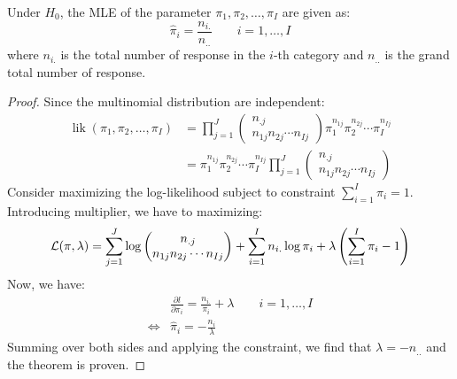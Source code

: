 \begin{proposition}
    Under $H_0$, the MLE of the parameter $\pi_1,\pi_2,\dots,\pi_I$ are given as:
    \begin{equation*}
        \hat{\pi}_i = \frac{n_{i.}}{n_{..}} \qquad i = 1,\dots,I
    \end{equation*}
    where $n_{i.}$ is the total number of response in the $i$-th category and $n_{..}$ is the grand total number of response. 
\end{proposition}
\begin{proof}
    Since the multinomial distribution are independent:
    \begin{equation*}
    \begin{aligned}
        \operatorname{lik}(\pi_1,\pi_2,\dots,\pi_I) &= 
        \prod^J_{j=1}\begin{pmatrix}
            n_{.j} \\ n_{1j}n_{2j}\cdots n_{Ij}
        \end{pmatrix} 
        \pi^{n_{1j}}_1\pi^{n_{2j}}_2\cdots\pi^{n_{Ij}}_I \\
        &=  \pi^{n_{1j}}_1\pi^{n_{2j}}_2\cdots\pi^{n_{Ij}}_I
        \prod^J_{j=1}
        \begin{pmatrix}
            n_{.j} \\ n_{1j}n_{2j}\cdots n_{Ij}
        \end{pmatrix} 
    \end{aligned}
    \end{equation*}
    Consider maximizing the log-likelihood subject to constraint $\sum^I_{i=1}\pi_i = 1$. Introducing multiplier, we have to maximizing:
    \begin{equation*}
        \mathcal{L}(\pi, \lambda) = \sum^J_{j=1}\log  
        \begin{pmatrix}
            n_{.j} \\ n_{1j}n_{2j}\cdots n_{Ij}
        \end{pmatrix} + \sum^I_{i=1}n_{i.}\log\pi_i + \lambda\left( \sum^I_{i=1}\pi_i-1 \right)
    \end{equation*}
    Now, we have:
    \begin{equation*}
    \begin{aligned}
        &\frac{\partial l}{\partial \pi_i} = \frac{n_{i.}}{\pi_i} + \lambda \qquad i =1,\dots,I \\
        \iff&\hat{\pi}_i = -\frac{n_i}{\lambda}
    \end{aligned}
    \end{equation*}
    Summing over both sides and applying the constraint, we find that $\lambda = -n_{..}$ and the theorem is proven.
\end{proof}

